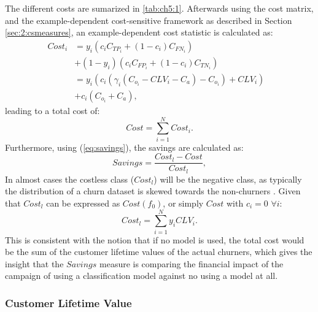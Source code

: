 The different costs are sumarized in \tablename{ \ref{tab:ch5:1}}.	Afterwards using the cost 
matrix, and the example-dependent cost-sensitive framework as described in Section 
\ref{sec:2:csmeasures}, an example-dependent cost statistic is calculated as:
\begin{align}
  Cost_i &= y_i(c_i C_{TP_i} + (1-c_i)C_{FN_i})& \nonumber \\
         &  + (1-y_i)(c_i C_{FP_i} + (1-c_i)C_{TN_i})& \nonumber \\
         &= y_i(c_i\left(\gamma_i(C_{o_i}-CLV_i-C_a)-C_{o_i}\right)+CLV_i)&\nonumber \\
         & +c_i(C_{o_i}+C_a),&
	\end{align}
leading to a total cost of:
\begin{equation}
    Cost = \sum_{i=1}^N Cost_i.
\end{equation}
Furthermore, using (\ref{eq:savings}), the savings are calculated as:
\begin{equation}
  Savings = \frac{Cost_l - Cost}{Cost_l},
\end{equation} 
In almost cases the costless class ($Cost_l$) will be the negative class, as typically the 
distribution of a churn dataset is skewed towards the non-churners \citep{Verbeke2012}. Given that 
$Cost_l$ can be expressed as $Cost(f_0)$, or simply $Cost$ with $c_i=0$ $\forall i$:
\begin{equation}
 Cost_l = \sum_{i=1}^{N} y_i CLV_i.
\end{equation}
This is consistent with the notion that if no model is used, the total cost would be the 
sum of the customer lifetime values of the actual churners, which gives the insight 
that the $Savings$ measure is comparing the financial impact of the campaign of using a 
classification model against no using a model at all.


\subsubsection{Customer Lifetime Value}

